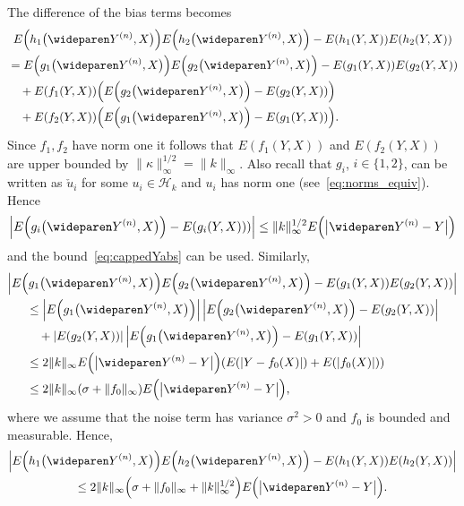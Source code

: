 \documentclass[AHL,Unicode,longabstracts,published]{cedram}
\theoremstyle{remark}
\newcommand{\cH}{\mathcal{H}}
\let\originalleft\left
\let\originalright\right
\renewcommand{\left}{\mathopen{}\mathclose\bgroup\originalleft}
\renewcommand{\right}{\aftergroup\egroup\originalright}
\begin{document}
The difference of the bias terms becomes
\begin{multline*}
E\left(h_1\bigl(\wideparen Y^{(n)},X\bigr)\right) E\left(h_2\bigl(\wideparen Y^{(n)},X\bigr)\right) - E(h_1(Y,X)) E(h_2(Y,X)) \\
\begin{aligned}
&= E\left(g_1 \bigl(\wideparen Y^{(n)},X\bigr)\right) E\left(g_2\bigl(\wideparen Y^{(n)},X\bigr)\right) - E(g_1 (Y,X)) E(g_2(Y,X))\\
&\quad+ E(f_1(Y,X)) \left(E\left(g_2\bigl(\wideparen Y^{(n)},X\bigr)\right) - E(g_2(Y,X))\right)\\
&\quad+ E(f_2(Y,X)) \left(E\left(g_1\bigl(\wideparen Y^{(n)},X\bigr)\right) - E(g_1(Y,X))\right).
\end{aligned}
\end{multline*}
Since $f_1,f_2$ have norm one it follows that $E(f_1(Y,X))$ and $E(f_2(Y,X))$ are upper bounded by $\|\kappa\|_\infty^{1/2} = \|k\|_\infty$. Also recall that $g_i$, $i\in \{1,2\}$, can be written as $\check{u}_i$ for some $u_i \in \cH_k$ and $u_i$ has norm one (see~\eqref{eq:norms_equiv}). Hence
\[
\left|E\left(g_i\bigl(\wideparen Y^{(n)},X\bigr)\right) - E(g_i(Y,X)))\right| \leq \|k\|_\infty^{1/2} E\left(\bigl|\wideparen Y^{(n)} - Y\bigr|\right)
\]
and the bound~\eqref{eq:cappedYabs} can be used. Similarly,
\begin{multline*}
\left|E\left(g_1 \bigl(\wideparen Y^{(n)},X\bigr)\right) E\left(g_2\bigl(\wideparen Y^{(n)},X\bigr)\right) - E(g_1 (Y,X)) E(g_2(Y,X))\right|\\
\begin{aligned}
&\leq \left|E\left(g_1\bigl(\wideparen Y^{(n)},X\bigr)\right)\right| \, \left|E\left(g_2\bigl(\wideparen Y^{(n)},X\bigr)\right) - E(g_2(Y,X))\right| \\
&\quad + |E(g_2 (Y,X))| \, \left|E\left(g_1\bigl(\wideparen Y^{(n)},X\bigr)\right) - E(g_1(Y,X))\right| \\
&\leq 2 \|k\|_\infty E\left(\bigl|\wideparen Y^{(n)} - Y\bigr|\right) (E(|Y- f_0(X)|) + E(|f_0(X)|)) \\
&\leq 2 \|k\|_\infty (\sigma + \|f_0\|_\infty) E\left(\bigl|\wideparen Y^{(n)} - Y\bigr|\right),
\end{aligned}
\end{multline*}
where we assume that the noise term has variance $\sigma^2 > 0$ and $f_0$ is bounded and measurable. Hence,
\begin{multline*}
\left|E\left(h_1\bigl(\wideparen Y^{(n)},X\bigr)\right) E\left(h_2\bigl(\wideparen Y^{(n)},X\bigr)\right) - E(h_1(Y,X)) E(h_2(Y,X))\right| \\
\leq 2 \|k\|_\infty \left(\sigma + \|f_0\|_\infty +\|k\|_\infty^{1/2}\right) E\left(\bigl|\wideparen Y^{(n)} - Y\bigr|\right).
\end{multline*}
\end{document}
